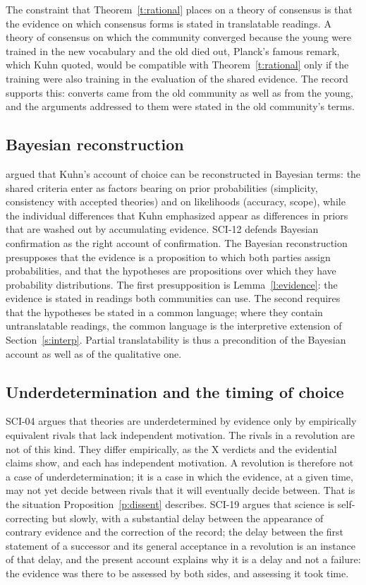 \documentclass{situationist-preprint}
\begin{document}
The constraint that Theorem~\ref{t:rational} places on a theory of consensus is that the evidence on which consensus forms is stated in translatable readings. A theory of consensus on which the community converged because the young were trained in the new vocabulary and the old died out, Planck's famous remark, which Kuhn quoted, would be compatible with Theorem~\ref{t:rational} only if the training were also training in the evaluation of the shared evidence. The record supports this: converts came from the old community as well as from the young, and the arguments addressed to them were stated in the old community's terms.

\subsection{Bayesian reconstruction}

\citet{Salmon1990} argued that Kuhn's account of choice can be reconstructed in Bayesian terms: the shared criteria enter as factors bearing on prior probabilities (simplicity, consistency with accepted theories) and on likelihoods (accuracy, scope), while the individual differences that Kuhn emphasized appear as differences in priors that are washed out by accumulating evidence. SCI-12 defends Bayesian confirmation as the right account of confirmation. The Bayesian reconstruction presupposes that the evidence is a proposition to which both parties assign probabilities, and that the hypotheses are propositions over which they have probability distributions. The first presupposition is Lemma~\ref{l:evidence}: the evidence is stated in readings both communities can use. The second requires that the hypotheses be stated in a common language; where they contain untranslatable readings, the common language is the interpretive extension of Section~\ref{s:interp}. Partial translatability is thus a precondition of the Bayesian account as well as of the qualitative one.

\subsection{Underdetermination and the timing of choice}

SCI-04 argues that theories are underdetermined by evidence only by empirically equivalent rivals that lack independent motivation. The rivals in a revolution are not of this kind. They differ empirically, as the X verdicts and the evidential claims show, and each has independent motivation. A revolution is therefore not a case of underdetermination; it is a case in which the evidence, at a given time, may not yet decide between rivals that it will eventually decide between. That is the situation Proposition~\ref{p:dissent} describes. SCI-19 argues that science is self-correcting but slowly, with a substantial delay between the appearance of contrary evidence and the correction of the record; the delay between the first statement of a successor and its general acceptance in a revolution is an instance of that delay, and the present account explains why it is a delay and not a failure: the evidence was there to be assessed by both sides, and assessing it took time.
\end{document}
